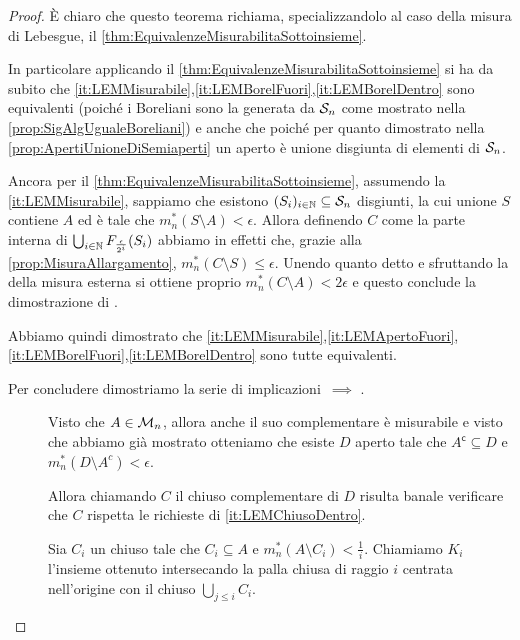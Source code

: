 \begin{proof}
	È chiaro che questo teorema richiama, specializzandolo al caso della misura di Lebesgue, il \cref{thm:EquivalenzeMisurabilitaSottoinsieme}.
	
	In particolare applicando il \cref{thm:EquivalenzeMisurabilitaSottoinsieme} si ha da subito che \ref{it:LEMMisurabile},\ref{it:LEMBorelFuori},\ref{it:LEMBorelDentro} sono equivalenti (poiché i Boreliani sono la \sigalg{} generata da $\S_n$ come mostrato nella \cref{prop:SigAlgUgualeBoreliani}) e anche che  poiché per quanto dimostrato nella \cref{prop:ApertiUnioneDiSemiaperti} un aperto è unione disgiunta di elementi di $\S_n$.
	
	Ancora per il \cref{thm:EquivalenzeMisurabilitaSottoinsieme}, assumendo la \ref{it:LEMMisurabile}, sappiamo che esistono $(S_i)_{i\in\N}\subseteq \S_n$ disgiunti, la cui unione $S$ contiene $A$ ed è tale che $m_n^*(S\setminus A)<\epsilon$.
	Allora definendo $C$ come la parte interna di $\bigcup_{i\in\N}F_\frac{\epsilon}{2^i}(S_i)$ abbiamo in effetti che, grazie alla \cref{prop:MisuraAllargamento}, $m_n^*(C\setminus S)\le \epsilon$.
	Unendo quanto detto e sfruttando la \sigsubadd[ità] della misura esterna si ottiene proprio $m_n^*(C\setminus A)<2\epsilon$ e questo conclude la dimostrazione di .
	
	Abbiamo quindi dimostrato che \ref{it:LEMMisurabile},\ref{it:LEMApertoFuori},\ref{it:LEMBorelFuori},\ref{it:LEMBorelDentro} sono tutte equivalenti.
	
	Per concludere dimostriamo la serie di implicazioni $\,\implies\,\,$.
	\begin{description}
		\item[] Visto che $A\in\M_n$, allora anche il suo complementare è misurabile e visto che abbiamo già mostrato  otteniamo che esiste $D$ aperto tale che $A^\mathsf{c}\subseteq D$ e $m_n^*(D\setminus A^c)< \epsilon$.
		
		Allora chiamando $C$ il chiuso complementare di $D$ risulta banale verificare che $C$ rispetta le richieste di \ref{it:LEMChiusoDentro}.
		\item[] Sia $C_i$ un chiuso tale che $C_i\subseteq A$ e $m_n^*(A\setminus C_i)<\frac1i$.
		Chiamiamo $K_i$ l'insieme ottenuto intersecando la palla chiusa di raggio $i$ centrata nell'origine con il chiuso $\bigcup_{j\le i}C_i$.
		

\end{description}
\end{proof}
